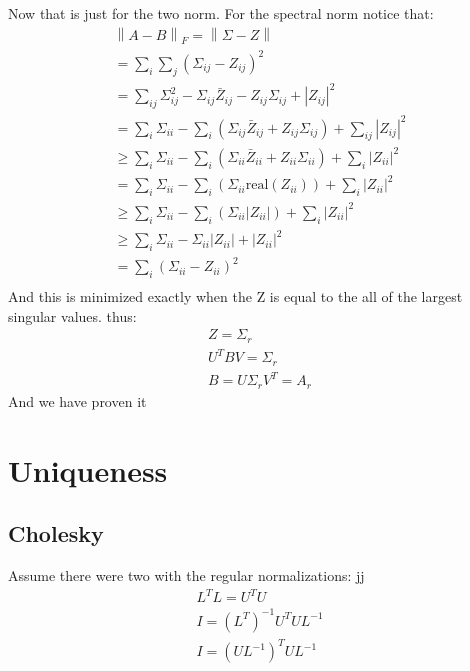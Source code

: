 \documentclass[12pt]{article}
\newcommand{\norm}[1]{\left\lVert#1\right\rVert}
\begin{document}
Now that is just for the two norm. For the spectral norm notice that:
\begin{align*}
	\norm{A-B}_F=\norm{\Sigma - Z}                                                                       \\
	=\sum_i\sum_j(\Sigma_{ij}-Z_{ij})^2                                                                  \\
	=\sum_{ij}\Sigma_{ij}^2 -\Sigma_{ij}\bar Z_{ij} - Z_{ij}\Sigma_{ij} + |Z_{ij}|^2                     \\
	=\sum_{i} \Sigma_{ii} - \sum_{i}(\Sigma_{ij}\bar Z_{ij} + Z_{ij}\Sigma_{ij}) + \sum_{ij}|Z_{ij}|^2   \\
	\geq\sum_{i} \Sigma_{ii} - \sum_{i}(\Sigma_{ii}\bar Z_{ii} + Z_{ii}\Sigma_{ii}) + \sum_{i}|Z_{ii}|^2 \\
	=\sum_{i} \Sigma_{ii} - \sum_{i}(\Sigma_{ii}\text{real} (Z_{ii})) + \sum_{i}|Z_{ii}|^2               \\
	\geq \sum_{i} \Sigma_{ii} - \sum_{i}(\Sigma_{ii}|Z_{ii}|)  + \sum_{i}|Z_{ii}|^2                      \\
	\geq \sum_{i} \Sigma_{ii} - \Sigma_{ii}|Z_{ii}| + |Z_{ii}|^2                                         \\
	=\sum_{i}(\Sigma_{ii}-Z_{ii})^2                                                                      \\
\end{align*}
And this is minimized exactly when the Z is equal to the all of the largest singular values. thus:
\begin{align*}
	Z=\Sigma_r       \\
	U^TBV = \Sigma_r \\
	B = U\Sigma_rV^T=A_r
\end{align*}
And we have proven it
\section{Uniqueness}
\subsection{Cholesky}

Assume there were two with the regular normalizations:
jj
\begin{align*}
	L^TL=U^TU                \\
	I = (L^T)^{-1}U^TUL^{-1} \\
	I = (UL^{-1})^{T}UL^{-1} \\
\end{align*}
\end{document}

